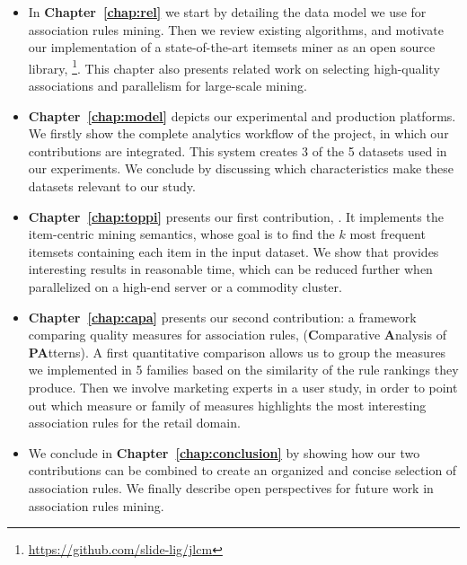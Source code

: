 \begin{itemize}
  \item In {\bf Chapter~\ref{chap:rel}} we start by detailing the data model we use for association rules mining.
    Then we review existing algorithms,
    and motivate our implementation of a state-of-the-art itemsets miner
    as an open source library,
    \jlcm\footnote{\url{https://github.com/slide-lig/jlcm}}.
    This chapter also presents related work on selecting high-quality associations
    and parallelism for large-scale mining.

  \item {\bf Chapter~\ref{chap:model}} depicts our experimental and production platforms.
    We firstly show the complete analytics workflow of the \datalyse project,
    in which our contributions are integrated.
    This system creates 3 of the 5 datasets used in our experiments.
    We conclude by discussing which characteristics make these datasets relevant to our study.

  \item {\bf Chapter~\ref{chap:toppi}} presents our first contribution, \toppi.
    It implements the item-centric mining semantics,
    whose goal is to find the $k$ most frequent itemsets containing each item in the input dataset.
    We show that \toppi provides interesting results in reasonable time,
    which can be reduced further when parallelized on a high-end server or a commodity cluster.

  \item {\bf Chapter~\ref{chap:capa}} presents our second contribution:
    a framework comparing quality measures for association rules,
    \capa ({\bf C}omparative {\bf A}nalysis of {\bf PA}tterns).
    A first quantitative comparison allows us to group the \nbm measures we implemented in 5 families
    based on the similarity of the rule rankings they produce.
    Then we involve marketing experts in a user study,
    in order to point out which measure or family of measures highlights the most interesting
    association rules for the retail domain.

  \item We conclude in {\bf Chapter~\ref{chap:conclusion}} by showing how our two contributions
  can be combined to create an organized and concise selection of association rules.
  We finally describe open perspectives for future work in association rules mining.
\end{itemize}
